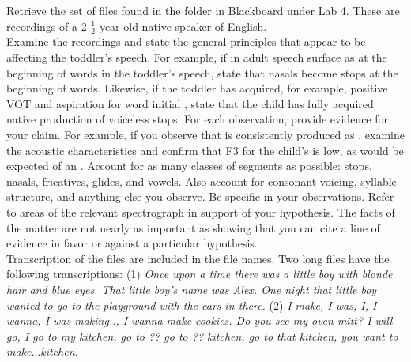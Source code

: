 \documentclass[lab={4},title={Phonetics of toddler speech},addfiller=true,turnin=false]{com310lab}
\begin{document}
\begin{task}
	Retrieve the set of files found in the folder in Blackboard under Lab 4.
	These are recordings of a 2 $\frac{1}{2}$ year-old native speaker of English.\\

	Examine the recordings and state the general principles that appear to be affecting the toddler's speech.
	For example, if  in adult speech surface as  at the beginning of words in the toddler's speech, state that nasals become stops at the beginning of words.
	Likewise, if the toddler has acquired, for example, positive VOT and aspiration for word initial , state that the child has fully acquired native production of voiceless stops.
	For each observation, provide evidence for your claim.
	For example, if you observe that  is consistently produced as , examine the acoustic characteristics and confirm that F3 for the child's  is low, as would be expected of an .
	Account for as many classes of segments as possible: stops, nasals, fricatives, glides, and vowels.
	Also account for consonant voicing, syllable structure, and anything else you observe.
	Be specific in your observations.
	Refer to areas of the relevant spectrograph in support of your hypothesis.
	The facts of the matter are not nearly as important as showing that you can cite a line of evidence in favor or against a particular hypothesis.\\

	Transcription of the files are included in the file names.
	Two long files have the following transcriptions: (1) \textit{Once upon a time there was a little boy with blonde hair and blue eyes.
	That little boy's name was Alex.
	One night that little boy wanted to go to the playground with the cars in there.}
	(2) \textit{I make, I was, I, I wanna, I was making.., I wanna make cookies.
	Do you see my oven mitt?
	I will go, I go to my kitchen, go to ?? go to ?? kitchen, go to that kitchen, you want to make$\dots$kitchen.}\\
\end{task}

\begin{writeup}
	\pagebreak
\end{writeup}

\labtitle

\begin{topic}
	\\
\end{topic}

\begin{issue}
	\\
\end{issue}

\begin{hypothesis}
	\\
\end{hypothesis}

\begin{method}
	\\
\end{method}

\begin{results}
	\\
\end{results}

\begin{discussion}
	\\
\end{discussion}
\end{document}
